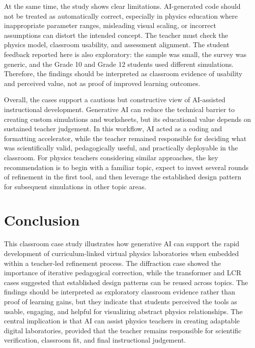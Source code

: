 \documentclass{iopjournal}
\begin{document}
At the same time, the study shows clear limitations. AI-generated code should not be treated as automatically correct, especially in physics education where inappropriate parameter ranges, misleading visual scaling, or incorrect assumptions can distort the intended concept. The teacher must check the physics model, classroom usability, and assessment alignment. The student feedback reported here is also exploratory: the sample was small, the survey was generic, and the Grade 10 and Grade 12 students used different simulations. Therefore, the findings should be interpreted as classroom evidence of usability and perceived value, not as proof of improved learning outcomes.

Overall, the cases support a cautious but constructive view of AI-assisted instructional development. Generative AI can reduce the technical barrier to creating custom simulations and worksheets, but its educational value depends on sustained teacher judgement. In this workflow, AI acted as a coding and formatting accelerator, while the teacher remained responsible for deciding what was scientifically valid, pedagogically useful, and practically deployable in the classroom. For physics teachers considering similar approaches, the key recommendation is to begin with a familiar topic, expect to invest several rounds of refinement in the first tool, and then leverage the established design pattern for subsequent simulations in other topic areas.

\section{Conclusion}

This classroom case study illustrates how generative AI can support the rapid development of curriculum-linked virtual physics laboratories when embedded within a teacher-led refinement process. The diffraction case showed the importance of iterative pedagogical correction, while the transformer and LCR cases suggested that established design patterns can be reused across topics. The findings should be interpreted as exploratory classroom evidence rather than proof of learning gains, but they indicate that students perceived the tools as usable, engaging, and helpful for visualizing abstract physics relationships. The central implication is that AI can assist physics teachers in creating adaptable digital laboratories, provided that the teacher remains responsible for scientific verification, classroom fit, and final instructional judgement.
\end{document}
